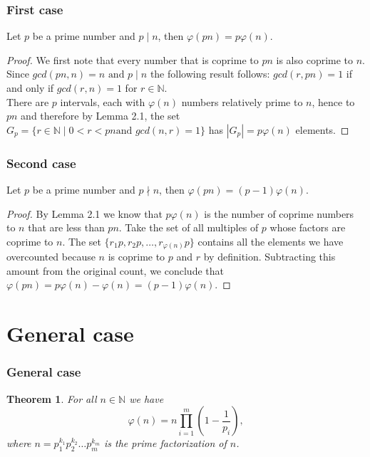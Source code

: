 \documentclass[envcountsect]{beamer}
\newtheorem*{theorem*}{Theorem}
\begin{document}
\begin{frame}
\frametitle{First case}

\begin{lemma}
Let $p$ be a prime number and $p \mid n$, then $\varphi(pn) = p\varphi(n)$.
\end{lemma}

\begin{proof}
We first note that every number that is coprime to $pn$ is also coprime to $n$.
Since $gcd(pn,n) = n \text{ and } p \mid n$ the following result follows: $gcd(r,pn) = 1$
if and only if $gcd(r,n) = 1$ for $r \in \mathbb{N}$. \\
There are $p$ intervals, each with $\varphi(n)$ numbers relatively prime to
$n$, hence to $pn$ and therefore by Lemma 2.1, the set $G_p = \{ r \in \mathbb{N} \mid 0<r<pn \text{
and } gcd(n,r) = 1\}$ has $|G_p|=p\varphi(n)$ elements.
\end{proof}

\end{frame}

\begin{frame}
\frametitle{Second case}

\begin{lemma}
Let $p$ be a prime number and $p \nmid n$, then $\varphi(pn) = (p-1)\varphi(n)$.

\end{lemma}
\begin{proof}

By Lemma 2.1 we know that $p\varphi(n)$ is the number of coprime
numbers to $n$ that are less than $pn$. Take the set of all multiples of $p$ whose
factors are coprime to $n$. The set $\{r_1p,r_2p,\dots,r_{\varphi(n)}p\}$
contains all the elements we have overcounted because $n$ is coprime to $p$ and
$r$ by definition. Subtracting this amount from the original count, we conclude
that $\varphi(pn) =p\varphi(n) - \varphi(n) = (p-1)\varphi(n).$

\end{proof}

\end{frame}

\section{General case}

\begin{frame}
\frametitle{General case}

\begin{theorem*}
For all $n \in \mathbb{N}$ we have $$ \varphi(n) = n\prod_{i=1}^m
\left(1-\frac{1}{p_i}\right), $$ 
where $n = p_1^{k_1}p_2^{k_2}\dots p_m^{k_m} $ is the prime factorization of
$n$.
\end{theorem*}
\end{frame}
\end{document}
